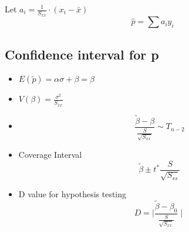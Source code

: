\documentclass{article}
\begin{document}
Let \(a_i = \frac{1}{S_{xx}} \cdot (x_i - \bar{x}) \)
$$ \hat{p} = \sum a_i y_i $$

\subsection{Confidence interval for p}
\begin{itemize}
\item \(E(\tilde{p}) = \alpha \sigma + \beta = \beta \)
\item \(V(\beta) = \frac{\sigma^2}{S_{xx}}\)
\item \[ \frac{\tilde{\beta} - \beta}{\frac{S}{\sqrt{S_{xx}}}} \sim T_{n-2}\]
\item Coverage Interval 
\[\tilde{\beta} \pm t^* \frac{S}{\sqrt{S_{ss}}}\]
\item D value for hypothesis testing 
\[D = \mid \frac{\tilde{\beta} - \beta_0}{\frac{S}{\sqrt{S_{xx}}}} \mid \] 
\end{itemize}
\end{document}
